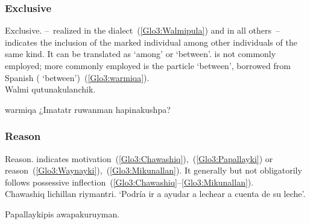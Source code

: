 {\subsubsection{Exclusive }
Exclusive.  --~realized  in the \CH{} dialect~(\ref{Glo3:Walmipula}) and  in all others~-- indicates the inclusion of the marked individual among other individuals of the same kind. It can be translated as ‘among’ or ‘between’.  is not commonly employed; more commonly employed is the particle  ‘between’, borrowed from Spanish ( ‘between’)~(\ref{Glo3:warmiqa}).\\

%
{Walmi qutunakulanchik.}%
{}%
{}{}%

%
{ warmiqa ¿Imatatr ruwanman hapinakushpa?}%
{}%
{}{}%

\subsubsection{Reason }
Reason.  indicates motivation~(\ref{Glo3:Chawashiq}),~(\ref{Glo3:Papallayki}) or reason~(\ref{Glo3:Waynayki}),~(\ref{Glo3:Mikunallan}). It generally but not obligatorily follows possessive inflection~(\ref{Glo3:Chawashiq}--\ref{Glo3:Mikunallan}).\\

%
{Chawashiq lichillan riymantri.}%
{}%
{‘Podría ir a ayudar a lechear a cuenta de su leche’.}%
{}{}%

%
{Papallaykipis awapakuruyman.}%
{}%
{}{}%

}
